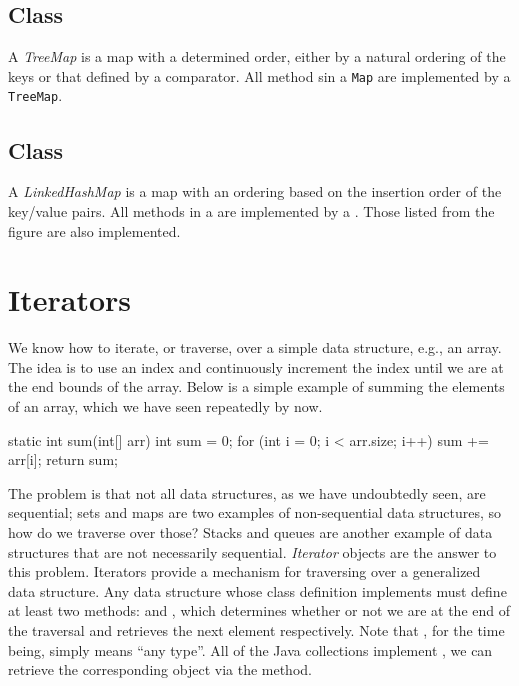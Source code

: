 \subsection*{ Class}
A \textit{TreeMap} is a map with a determined order, either by a natural ordering of the keys or that defined by a comparator. All method sin a \texttt{Map} are implemented by a \texttt{TreeMap}.

\subsection*{ Class}
A \textit{LinkedHashMap} is a map with an ordering based on the insertion order of the key/value pairs. All methods in a  are implemented by a . Those listed from the  figure are also implemented.

\section*{Iterators}
We know how to iterate, or traverse, over a simple data structure, e.g., an array. The idea is to use an index and continuously increment the index until we are at the end bounds of the array. Below is a simple example of summing the elements of an array, which we have seen repeatedly by now.

\begin{verbnobox}[\small]
static int sum(int[] arr) {
  int sum = 0;
  for (int i = 0; i < arr.size; i++) { sum += arr[i]; }
  return sum;
}
\end{verbnobox}

The problem is that not all data structures, as we have undoubtedly seen, are sequential; sets and maps are two examples of non-sequential data structures, so how do we traverse over those? Stacks and queues are another example of data structures that are not necessarily sequential. \textit{Iterator} objects are the answer to this problem. Iterators provide a mechanism for traversing over a generalized data structure. Any data structure whose class definition implements  must define at least two methods:  and , which determines whether or not we are at the end of the traversal and retrieves the next element respectively. Note that , for the time being, simply means ``any type''. All of the Java collections implement , we can retrieve the corresponding  object via the  method. 

